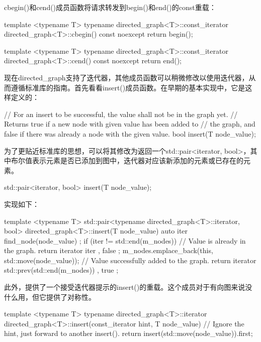 cbegin()和cend()成员函数将请求转发到begin()和end()的const重载：

\begin{cpp}
template <typename T>
typename directed_graph<T>::const_iterator
    directed_graph<T>::cbegin() const noexcept { return begin(); }

template <typename T>
typename directed_graph<T>::const_iterator
    directed_graph<T>::cend() const noexcept { return end(); }
\end{cpp}


现在directed\_graph支持了迭代器，其他成员函数可以稍微修改以使用迭代器，从而遵循标准库的指南。首先看看insert()成员函数。在早期的基本实现中，它是这样定义的：

\begin{cpp}
// For an insert to be successful, the value shall not be in the graph yet.
// Returns true if a new node with given value has been added to // the graph, and false if there was already a node with the given value.
bool insert(T node_value);
\end{cpp}

为了更贴近标准库的思想，可以将其修改为返回一个std::pair<iterator, bool>，其中布尔值表示元素是否已添加到图中，迭代器对应该新添加的元素或已存在的元素。

\begin{cpp}
std::pair<iterator, bool> insert(T node_value);
\end{cpp}

实现如下：

\begin{cpp}
template <typename T>
std::pair<typename directed_graph<T>::iterator, bool>
    directed_graph<T>::insert(T node_value)
{
    auto iter { find_node(node_value) };
    if (iter != std::end(m_nodes)) {
        // Value is already in the graph.
        return { iterator { iter }, false };
    }
    m_nodes.emplace_back(this, std::move(node_value));
    // Value successfully added to the graph.
    return { iterator { std::prev(std::end(m_nodes)) }, true };
}
\end{cpp}

此外，提供了一个接受迭代器提示的insert()的重载。这个成员对于有向图来说没什么用，但它提供了对称性。

\begin{cpp}
template <typename T>
typename directed_graph<T>::iterator
    directed_graph<T>::insert(const_iterator hint, T node_value)
{
    // Ignore the hint, just forward to another insert().
    return insert(std::move(node_value)).first;
}
\end{cpp}

